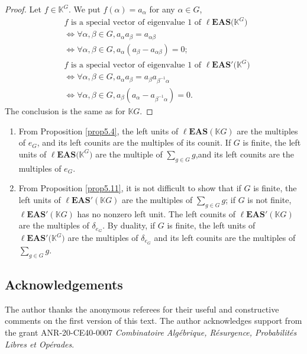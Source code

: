 \documentclass[pdftex]{sigma}
\numberwithin{equation}{section}
\newcommand{\leas}{\ell\mathbf{EAS}}
\begin{document}
\begin{proof}
Let $f\in \mathbb{K}^G$. We put $f(\alpha)=a_\alpha$ for any $\alpha \in G$,
\begin{align*}
&f\text{ is a special vector of eigenvalue 1 of }\leas\bigl(\mathbb{K}^G\bigr)\\
&\Longleftrightarrow\forall \alpha,\beta \in G, a_\alpha a_\beta=a_{\alpha\beta}\\
&\Longleftrightarrow\forall \alpha,\beta \in G, a_\alpha(a_\beta-a_{\alpha\beta})=0;\\
&f\text{ is a special vector of eigenvalue 1 of }\leas'\bigl(\mathbb{K}^G\bigr)\\
&\Longleftrightarrow\forall \alpha,\beta \in G, a_\alpha a_\beta=a_\beta a_{\beta^{-1}\alpha}\\
&\Longleftrightarrow\forall \alpha,\beta \in G, a_\beta(a_\alpha-a_{\beta^{-1}\alpha})=0.
\end{align*}
The conclusion is the same as for $\mathbb{K} G$. \end{proof}

\begin{Remark}\quad
\begin{enumerate}\itemsep=0pt
\item[(1)] From Proposition \ref{prop5.4}, the left units of $\leas(\mathbb{K} G)$ are the multiples of $e_G$, and its left counits are the multiples of its counit.
If $G$ is finite, the left units of $\leas\bigl(\mathbb{K}^G\bigr)$ are the multiple of $ \sum_{g\in G} g$,and its left counits are the multiples of $e_G$.
\item[(2)] From Proposition \ref{prop5.11}, it is not difficult to show that if $G$ is finite, the left units of $\leas'(\mathbb{K} G)$ are the multiples of $ \sum_{g\in G} g$; if $G$ is not finite, $\leas'(\mathbb{K} G)$ has no nonzero left unit.
The left counits of $\leas'(\mathbb{K} G)$ are the multiples of $\delta_{e_G}$.
By duality, if $G$ is finite, the left units of $\leas'\bigl(\mathbb{K}^G\bigr)$ are the multiples of $\delta_{e_G}$ and its left counits are the multiples of $ \sum_{g\in G} g$.
\end{enumerate}\end{Remark}

\subsection*{Acknowledgements}

The author thanks the anonymous referees for their useful and constructive comments on the first version of this text. The author acknowledges support from the grant ANR-20-CE40-0007 \emph{Combinatoire Alg\'e\-brique, R\'esurgence, Probabilit\'es Libres et Op\'erades}.
\end{document}
